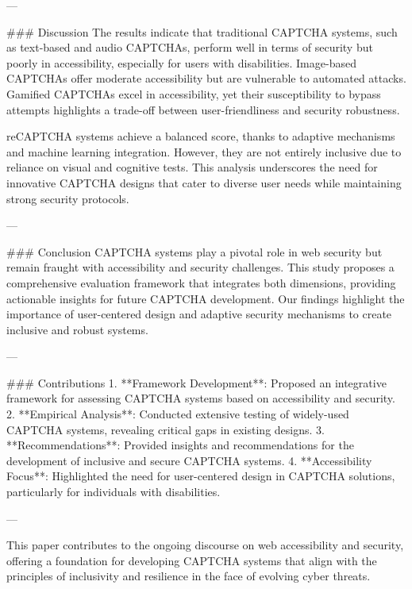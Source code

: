 ---

### Discussion
The results indicate that traditional CAPTCHA systems, such as text-based and audio CAPTCHAs, perform well in terms of security but poorly in accessibility, especially for users with disabilities. Image-based CAPTCHAs offer moderate accessibility but are vulnerable to automated attacks. Gamified CAPTCHAs excel in accessibility, yet their susceptibility to bypass attempts highlights a trade-off between user-friendliness and security robustness.

reCAPTCHA systems achieve a balanced score, thanks to adaptive mechanisms and machine learning integration. However, they are not entirely inclusive due to reliance on visual and cognitive tests. This analysis underscores the need for innovative CAPTCHA designs that cater to diverse user needs while maintaining strong security protocols.

---

### Conclusion
CAPTCHA systems play a pivotal role in web security but remain fraught with accessibility and security challenges. This study proposes a comprehensive evaluation framework that integrates both dimensions, providing actionable insights for future CAPTCHA development. Our findings highlight the importance of user-centered design and adaptive security mechanisms to create inclusive and robust systems.

---

### Contributions
1. **Framework Development**: Proposed an integrative framework for assessing CAPTCHA systems based on accessibility and security.
2. **Empirical Analysis**: Conducted extensive testing of widely-used CAPTCHA systems, revealing critical gaps in existing designs.
3. **Recommendations**: Provided insights and recommendations for the development of inclusive and secure CAPTCHA systems.
4. **Accessibility Focus**: Highlighted the need for user-centered design in CAPTCHA solutions, particularly for individuals with disabilities.

--- 

This paper contributes to the ongoing discourse on web accessibility and security, offering a foundation for developing CAPTCHA systems that align with the principles of inclusivity and resilience in the face of evolving cyber threats.